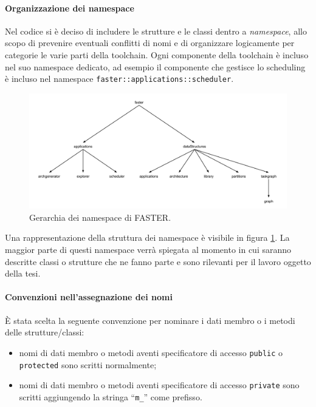 \paragraph{Organizzazione dei namespace}
Nel codice si è deciso di includere le strutture e le classi dentro a 
\emph{namespace}, allo scopo di prevenire eventuali conflitti di nomi e di 
organizzare logicamente per categorie le varie parti della toolchain. Ogni componente
della toolchain è incluso nel suo namespace dedicato, ad esempio il componente che
gestisce lo scheduling è incluso nel namespace \verb+faster::applications::scheduler+.

\begin{figure}
 \begin{center}
\includegraphics[width=\textwidth]{capitoli/figure/cap5/FASTERNamespaces.pdf}
\caption{Gerarchia dei namespace di \acs{FASTER}.}
\label{fig:gerarchiaNamespace}
 \end{center}
\end{figure}

Una rappresentazione della struttura dei namespace è visibile in figura 
\ref{fig:gerarchiaNamespace}. La maggior parte di questi namespace verrà 
spiegata al momento in cui saranno descritte classi o strutture che ne fanno parte 
e sono rilevanti per il lavoro oggetto della tesi.

\paragraph{Convenzioni nell'assegnazione dei nomi}
È stata scelta la seguente convenzione per nominare i dati membro o i metodi 
delle strutture/classi:
\begin{itemize}
 \item nomi di dati membro o metodi aventi specificatore di accesso 
\verb+public+ o \verb+protected+ sono scritti normalmente;
 \item nomi di dati membro o metodi aventi specificatore di accesso 
\verb+private+ sono scritti aggiungendo la stringa ``\verb+m_+'' come prefisso.
\end{itemize}

